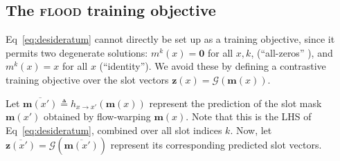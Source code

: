 \documentclass{article}
\begin{document}


\subsection{The \textsc{flood} training objective}

Eq~\eqref{eq:desideratum} cannot directly be set up as a training objective, since it permits two degenerate solutions: $m^k(x)=\bm{0}$ for all $x, k$, (``all-zeros'' ), and  $m^k(x)=x$ for all $x$ (``identity''). We avoid these by defining a contrastive training objective over the slot vectors $\bm{z}(x) = \mathcal{G}(\bm{m}(x))$. 


Let $\overline{\bm{m}(x')} \triangleq h_{x \rightarrow x'}(\bm{m}(x))$ represent the prediction of the slot mask $\bm{m}(x')$ obtained by flow-warping $\bm{m}(x)$. Note that this is the LHS of Eq~\eqref{eq:desideratum}, combined over all slot indices $k$.  Now, let $\overline{\bm{z}(x')}=\mathcal{G}(\overline{\bm{m}(x')})$ represent its corresponding predicted slot vectors. 
\end{document}
